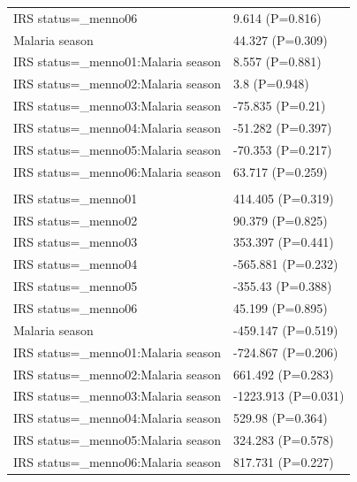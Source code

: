 \documentclass[]{article}
\begin{document}
\begin{longtable}[t]{ll}
\hspace{1em}IRS status=\_menno06 & 9.614 (P=0.816)\\
\hspace{1em}Malaria season & 44.327 (P=0.309)\\
\hspace{1em}IRS status=\_menno01:Malaria season & 8.557 (P=0.881)\\
\hspace{1em}IRS status=\_menno02:Malaria season & 3.8 (P=0.948)\\
\hspace{1em}IRS status=\_menno03:Malaria season & -75.835 (P=0.21)\\
\hspace{1em}IRS status=\_menno04:Malaria season & -51.282 (P=0.397)\\
\hspace{1em}IRS status=\_menno05:Malaria season & -70.353 (P=0.217)\\
\hspace{1em}IRS status=\_menno06:Malaria season & 63.717 (P=0.259)\\
\addlinespace[1.5em]
\multicolumn{2}{l}{\textbf{Temporary not field worker}}\\
\hspace{1em}IRS status=\_menno01 & 414.405 (P=0.319)\\
\hspace{1em}IRS status=\_menno02 & 90.379 (P=0.825)\\
\hspace{1em}IRS status=\_menno03 & 353.397 (P=0.441)\\
\hspace{1em}IRS status=\_menno04 & -565.881 (P=0.232)\\
\hspace{1em}IRS status=\_menno05 & -355.43 (P=0.388)\\
\hspace{1em}IRS status=\_menno06 & 45.199 (P=0.895)\\
\hspace{1em}Malaria season & -459.147 (P=0.519)\\
\hspace{1em}IRS status=\_menno01:Malaria season & -724.867 (P=0.206)\\
\hspace{1em}IRS status=\_menno02:Malaria season & 661.492 (P=0.283)\\
\hspace{1em}IRS status=\_menno03:Malaria season & -1223.913 (P=0.031)\\
\hspace{1em}IRS status=\_menno04:Malaria season & 529.98 (P=0.364)\\
\hspace{1em}IRS status=\_menno05:Malaria season & 324.283 (P=0.578)\\
\hspace{1em}IRS status=\_menno06:Malaria season & 817.731 (P=0.227)\\*
\end{longtable}
\end{document}
